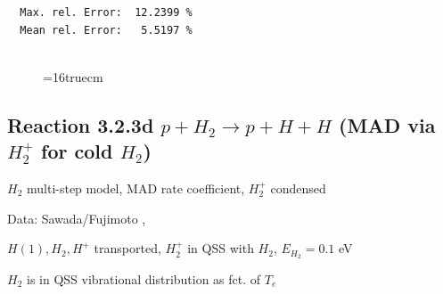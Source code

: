 \documentclass[12pt,dvips]{article}
\begin{document}
\begin{small}
\begin{verbatim}
  Max. rel. Error:  12.2399 %
  Mean rel. Error:   5.5197 %


\end{verbatim}\end{small}
\begin{figure} \label{2.2.5mar}
\epsfxsize=16truecm
\end{figure}
\newpage

\subsection{
Reaction 3.2.3d   $p + H_2   \rightarrow p + H + H  $ (MAD via $H_2^+$ for cold $H_2$)
}

$H_2$ multi-step model, MAD rate coefficient, $H_2^+$ condensed

 Data: Sawada/Fujimoto ,\cite{kn:Sawada}

$  H(1), H_2, H^+ $ transported, $H_2^+$ in QSS with $H_2$, $E_{H_2}=0.1$ eV


$H_2$ is in QSS vibrational distribution as fct. of $T_e$
\end{document}
